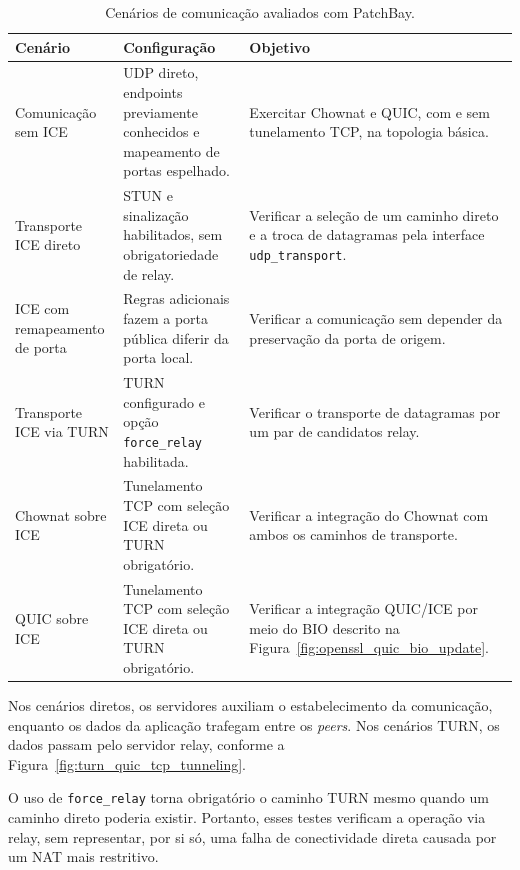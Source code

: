 \begin{table}[htbp]
    \centering
    \small
    \caption{Cenários de comunicação avaliados com PatchBay.}
    \label{tab:experimental_scenarios}
    \begin{tabular}{@{}p{}p{}p{}@{}}
        \toprule
        \textbf{Cenário} &
        \textbf{Configuração} &
        \textbf{Objetivo} \\
        \midrule
        Comunicação sem ICE &
        UDP direto, endpoints previamente conhecidos
        e mapeamento de portas espelhado. &
        Exercitar Chownat e QUIC, com e sem tunelamento
        TCP, na topologia básica. \\
        Transporte ICE direto &
        STUN e sinalização habilitados, sem
        obrigatoriedade de relay. &
        Verificar a seleção de um caminho direto
        e a troca de datagramas pela interface
        \texttt{udp\_transport}. \\
        ICE com remapeamento de porta &
        Regras adicionais fazem a porta pública
        diferir da porta local. &
        Verificar a comunicação sem depender
        da preservação da porta de origem. \\
        Transporte ICE via TURN &
        TURN configurado e opção
        \texttt{force\_relay} habilitada. &
        Verificar o transporte de datagramas por
        um par de candidatos relay. \\
        Chownat sobre ICE &
        Tunelamento TCP com seleção ICE direta
        ou TURN obrigatório. &
        Verificar a integração do Chownat com
        ambos os caminhos de transporte. \\
        QUIC sobre ICE &
        Tunelamento TCP com seleção ICE direta
        ou TURN obrigatório. &
        Verificar a integração QUIC/ICE por meio
        do BIO descrito na
        Figura~\ref{fig:openssl_quic_bio_update}. \\
        \bottomrule
    \end{tabular}
\end{table}

Nos cenários diretos, os servidores auxiliam o estabelecimento da comunicação, enquanto os dados da aplicação trafegam entre os \textit{peers}. Nos cenários TURN, os dados passam pelo servidor relay, conforme a Figura~\ref{fig:turn_quic_tcp_tunneling}.

O uso de \texttt{force\_relay} torna obrigatório o caminho TURN mesmo quando um caminho direto poderia existir. Portanto, esses testes verificam a operação via relay, sem representar, por si só, uma falha de conectividade direta causada por um NAT mais restritivo. 

